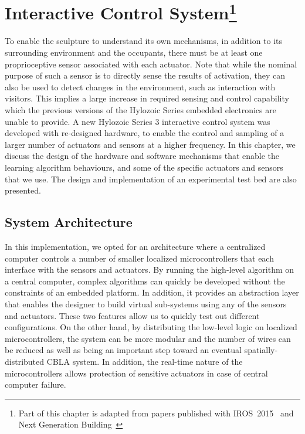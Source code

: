 \chapter[Interactive Control System]
{Interactive Control System\footnote{Part of this chapter is adapted from papers published with IROS~2015~\cite{Chan2015} and Next Generation  \mbox{Building}~\cite{Gorbet2015}}} 
\label{chap:ctrl_system}

To enable the sculpture to understand its own mechanisms, in addition to its surrounding environment and the occupants, there must be at least one proprioceptive sensor associated with each actuator. Note that while the nominal purpose of such a sensor is to directly sense the results of activation, they can also be used to detect changes in the environment, such as interaction with visitors. This implies a large increase in required sensing and control capability which the previous versions of the Hylozoic Series embedded electronics \cite{Beesley2010} are unable to provide. A new Hylozoic Series 3 interactive control system was developed with re-designed hardware, to enable the control and sampling of a larger number of actuators and sensors at a higher frequency. In this chapter, we discuss the design of the hardware and software mechanisms that enable the learning algorithm behaviours, and some of the specific actuators and sensors that we use. The design and implementation of an experimental test bed are also presented. 

\section{System Architecture}

In this implementation, we opted for an architecture where a centralized computer controls a number of smaller localized microcontrollers that each interface with the sensors and actuators. By running the high-level algorithm on a central computer, complex algorithms can quickly be developed without the constraints of an embedded platform. In addition, it provides an abstraction layer that enables the designer to build virtual sub-systems using any of the sensors and actuators. These two features allow us to quickly test out different configurations. On the other hand, by distributing the low-level logic on localized microcontrollers, the system can be more modular and the number of wires can be reduced as well as being an important step toward an eventual spatially-distributed CBLA system. In addition, the real-time nature of the microcontrollers allows protection of sensitive actuators in case of central computer failure. 

